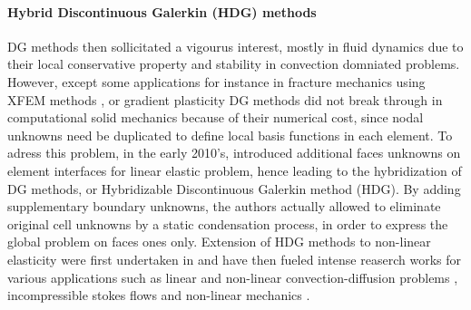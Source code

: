 
\paragraph{Hybrid Discontinuous Galerkin (HDG) methods}

DG methods then sollicitated a vigourus interest, mostly in fluid dynamics \cite{shahbazi_high-order_2007, persson_discontinuous_2009} due to their local conservative property and stability in convection domniated problems.
However, except some applications for instance in fracture mechanics using XFEM methods
\cite{gracie_blending_2008, shen_stability_2010}, or gradient plasticity \cite{djoko_discontinuous_2007,djoko_discontinuous_2007-1} DG methods did not break through in computational solid mechanics because of their numerical cost, since nodal unknowns need be duplicated to define local basis functions in each element.
To adress this problem, in the early 2010's, \cite{cockburn_unified_2009, soon_hybridizable_2009} introduced additional faces unknowns on element interfaces for linear elastic problem, hence leading to the hybridization of DG methods, or Hybridizable Discontinuous Galerkin method (HDG). By adding supplementary boundary unknowns, the authors actually allowed to eliminate original cell unknowns by a static condensation process, in order to express the global problem on faces ones only.
% 
% 
Extension of HDG methods to non-linear elasticity were first undertaken in \cite{soon_hybridizable_2008} and have then fueled intense reaserch works for various applications such as linear and non-linear convection-diffusion problems \cite{nguyen_implicit_2009,nguyen_implicit_2009-1,nguyen_hybridizable_2010}, incompressible stokes flows \cite{nguyen_hybridizable_2010, nguyen_implicit_2011} and non-linear mechanics \cite{nguyen_hybridizable_2012}.

